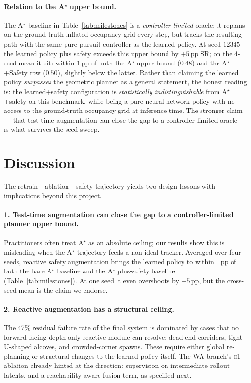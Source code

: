\documentclass[11pt,a4paper]{article}
\begin{document}
\paragraph{Relation to the A$^\star$ upper bound.} The A$^\star$
baseline in Table~\ref{tab:milestones} is a \emph{controller-limited}
oracle: it replans on the ground-truth inflated occupancy grid every
step, but tracks the resulting path with the same pure-pursuit
controller as the learned policy. At seed $12345$ the learned policy
plus safety exceeds this upper bound by $+5$\,pp SR; on the
4-seed mean it sits within $1$\,pp of both the A$^\star$ upper bound
($0.48$) and the A$^\star$+Safety row ($0.50$), slightly below the
latter. Rather than claiming the learned policy \emph{surpasses} the
geometric planner as a general statement, the honest reading is: the
learned+safety configuration is \emph{statistically indistinguishable}
from A$^\star$+safety on this benchmark, while being a pure
neural-network policy with no access to the ground-truth occupancy
grid at inference time. The stronger claim --- that test-time
augmentation can close the gap to a controller-limited oracle --- is
what survives the seed sweep.

\section{Discussion}\label{sec:disc}

The retrain---ablation---safety trajectory yields two design lessons
with implications beyond this project.

\paragraph{1. Test-time augmentation can close the gap to a
controller-limited planner upper bound.} Practitioners often treat
A$^\star$ as an absolute ceiling; our results show this is misleading
when the A$^\star$ trajectory feeds a non-ideal tracker. Averaged over
four seeds, reactive safety augmentation brings the learned policy to
within $1$\,pp of both the bare A$^\star$ baseline and the A$^\star$
plus-safety baseline (Table~\ref{tab:milestones}). At one seed it even
overshoots by $+5$\,pp, but the cross-seed mean is the claim we
endorse.

\paragraph{2. Reactive augmentation has a structural ceiling.} The
47\% residual failure rate of the final system is dominated by cases
that no forward-facing depth-only reactive module can resolve:
dead-end corridors, tight U-shaped alcoves, and crowded-corner spawns.
These require either global re-planning or structural changes to the
learned policy itself. The WA branch's \textsc{h1} ablation already
hinted at the direction: supervision on intermediate rollout latents,
and a reachability-aware fusion term, as specified next.
\end{document}
